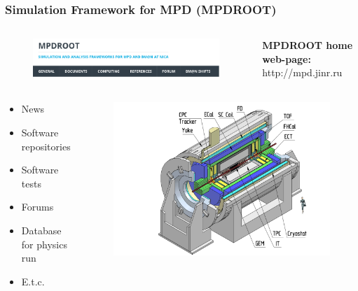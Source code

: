 \documentclass[dvipsnames] {beamer}
\begin{document}
 \begin{frame}[shrink=35]
  \bf
  \frametitle{\bf \centering Simulation Framework for MPD (MPDROOT)} 
  \begin{columns}[c]
    \begin{block}{}
      \begin{figure}[H]
        \includegraphics[width=1.\textwidth]{mpdroot_web.png}
      \end{figure}
    \end{block}
    \begin{block}{\bf \centering MPDROOT home web-page:}
      http://mpd.jinr.ru
    \end{block}
  \end{columns}
  \begin{columns}[c]
    \begin{block}{}
      \begin{itemize}
      \item News
      \item Software repositories
      \item Software tests
      \item Forums
      \item Database for physics run
      \item E.t.c.
      \end{itemize}
    \end{block}
    \begin{block}{}
      \begin{figure}[H]
        \includegraphics[width=1.\textwidth]{mpd.png}

\end{figure}
\end{block}
\end{columns}
\end{frame}
\end{document}

